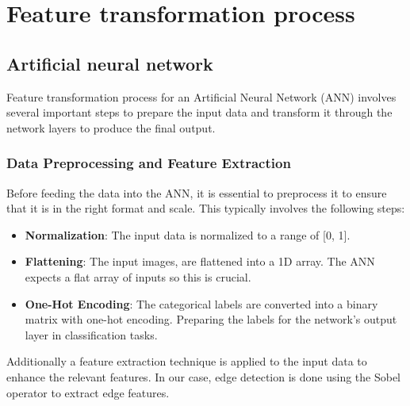 \section{Feature transformation process}


\subsection{Artificial neural network}

Feature transformation process for an Artificial Neural Network (ANN) involves several important steps to prepare the input data and transform it through the network layers to produce the final output.

\subsubsection{Data Preprocessing and Feature Extraction}
Before feeding the data into the ANN, it is essential to preprocess it to ensure that it is in the right format and scale. This typically involves the following steps:
\begin{itemize}
    \item \textbf{Normalization}: The input data is normalized to a range of [0, 1].
    \item \textbf{Flattening}: The input images, are flattened into a 1D array. The ANN expects a flat array of inputs so this is crucial.
    \item \textbf{One-Hot Encoding}: The categorical labels are converted into a binary matrix with one-hot encoding. Preparing the labels for the network's output layer in classification tasks.
\end{itemize}

Additionally a feature extraction technique is applied to the input data to enhance the relevant features. In our case, edge detection is done using the Sobel operator to extract edge features.

